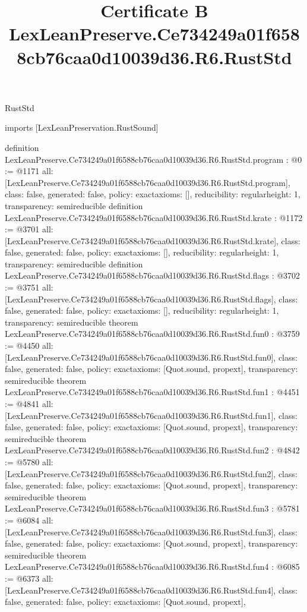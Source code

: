 \begin{lexlean}{RustStd}
\title{Certificate B LexLeanPreserve.Ce734249a01f6588cb76caa0d10039d36.R6.RustStd}
\begin{coremodule}
imports [LexLeanPreservation.RustSound]

definition LexLeanPreserve.Ce734249a01f6588cb76caa0d10039d36.R6.RustStd.program : @0 := @1171 {
  all: [LexLeanPreserve.Ce734249a01f6588cb76caa0d10039d36.R6.RustStd.program],
  class: false,
  generated: false,
  policy: exact{axioms: []},
  reducibility: regular{height: 1},
  transparency: semireducible
}
definition LexLeanPreserve.Ce734249a01f6588cb76caa0d10039d36.R6.RustStd.krate : @1172 := @3701 {
  all: [LexLeanPreserve.Ce734249a01f6588cb76caa0d10039d36.R6.RustStd.krate],
  class: false,
  generated: false,
  policy: exact{axioms: []},
  reducibility: regular{height: 1},
  transparency: semireducible
}
definition LexLeanPreserve.Ce734249a01f6588cb76caa0d10039d36.R6.RustStd.flags : @3702 := @3751 {
  all: [LexLeanPreserve.Ce734249a01f6588cb76caa0d10039d36.R6.RustStd.flags],
  class: false,
  generated: false,
  policy: exact{axioms: []},
  reducibility: regular{height: 1},
  transparency: semireducible
}
theorem LexLeanPreserve.Ce734249a01f6588cb76caa0d10039d36.R6.RustStd.fun0 : @3759 := @4450 {
  all: [LexLeanPreserve.Ce734249a01f6588cb76caa0d10039d36.R6.RustStd.fun0],
  class: false,
  generated: false,
  policy: exact{axioms: [Quot.sound, propext]},
  transparency: semireducible
}
theorem LexLeanPreserve.Ce734249a01f6588cb76caa0d10039d36.R6.RustStd.fun1 : @4451 := @4841 {
  all: [LexLeanPreserve.Ce734249a01f6588cb76caa0d10039d36.R6.RustStd.fun1],
  class: false,
  generated: false,
  policy: exact{axioms: [Quot.sound, propext]},
  transparency: semireducible
}
theorem LexLeanPreserve.Ce734249a01f6588cb76caa0d10039d36.R6.RustStd.fun2 : @4842 := @5780 {
  all: [LexLeanPreserve.Ce734249a01f6588cb76caa0d10039d36.R6.RustStd.fun2],
  class: false,
  generated: false,
  policy: exact{axioms: [Quot.sound, propext]},
  transparency: semireducible
}
theorem LexLeanPreserve.Ce734249a01f6588cb76caa0d10039d36.R6.RustStd.fun3 : @5781 := @6084 {
  all: [LexLeanPreserve.Ce734249a01f6588cb76caa0d10039d36.R6.RustStd.fun3],
  class: false,
  generated: false,
  policy: exact{axioms: [Quot.sound, propext]},
  transparency: semireducible
}
theorem LexLeanPreserve.Ce734249a01f6588cb76caa0d10039d36.R6.RustStd.fun4 : @6085 := @6373 {
  all: [LexLeanPreserve.Ce734249a01f6588cb76caa0d10039d36.R6.RustStd.fun4],
  class: false,
  generated: false,
  policy: exact{axioms: [Quot.sound, propext]},
}
\end{coremodule}
\end{lexlean}
